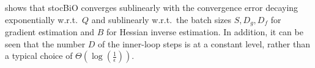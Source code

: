 \documentclass{osudissert96}
\newtheorem{corollary}{Corollary}
\begin{document}
 shows that stocBiO converges sublinearly with the convergence error decaying exponentially w.r.t.~$Q$ and sublinearly w.r.t.~the batch sizes $S,D_g,D_f$ for gradient estimation and $B$ for Hessian inverse estimation. In addition, it can be seen that the number $D$ of the inner-loop steps is %
at  a  constant level, rather than a typical choice of $\Theta(\log(\frac{1}{\epsilon}))$.
\end{document}
